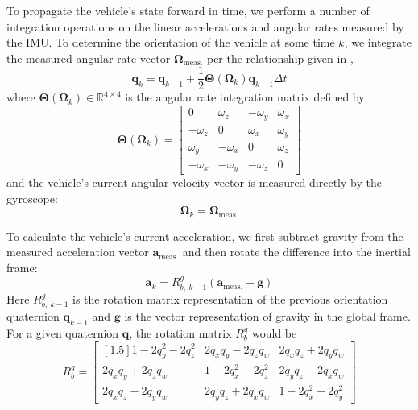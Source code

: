To propagate the vehicle's state forward in time, we perform a number of integration operations on the linear accelerations and angular rates measured by the IMU. To determine the orientation of the vehicle at some time $k$, we integrate the measured angular rate vector $\bm{\Omega}_{\text{meas.}}$ per the relationship given in \cite{Stevens2015},
%
\begin{equation} \label{eq:proc_quat}
\mathbf{q}_{k} = \mathbf{q}_{k-1} + \frac{1}{2} \mathbf{\Theta} \left( \bm{\Omega}_{k} \right) \mathbf{q}_{k-1} \Delta t
\end{equation}
%
where $\mathbf{\Theta} \left( \bm{\Omega}_{k} \right) \in \mathbb{R}^{4 \times 4}$ is the angular rate integration matrix defined by
%
\begin{equation}
\mathbf{\Theta} \left( \bm{\Omega}_{k} \right) =
\begin{bmatrix}
0 & \omega_{z} & -\omega_{y} & \omega_{x} \\
-\omega_{z} & 0 & \omega_{x} & \omega_{y} \\
\omega_{y} & -\omega_{x} & 0 & \omega_{z} \\
-\omega_{x} & -\omega_{y} & -\omega_{z} & 0
\end{bmatrix}
\end{equation}
%
and the vehicle's current angular velocity vector is measured directly by the gyroscope:
%
\begin{equation} \label{eq:proc_ang_vel}
\bm{\Omega}_{k} = \bm{\Omega}_{\text{meas.}}
\end{equation}

To calculate the vehicle's current acceleration, we first subtract gravity from the measured acceleration vector $\mathbf{a}_{\text{meas.}}$ and then rotate the difference into the inertial frame:
%
\begin{equation} \label{eq:proc_acc}
\mathbf{a}_{k} = R^{g}_{b,\ k-1} \left( \mathbf{a}_{\text{meas.}} - \mathbf{g} \right)
\end{equation}
%
Here $R^{g}_{b,\ k-1}$ is the rotation matrix representation of the previous orientation quaternion $\mathbf{q}_{k-1}$ and $\mathbf{g}$ is the vector representation of gravity in the global frame. For a given quaternion $\mathbf{q}$, the rotation matrix $R^{g}_{b}$ would be
%
\begin{equation}
R^{g}_{b} =
\begin{bmatrix}[1.5]
    1 - 2 q_{y}^2 - 2 q_{z}^2 & 2 q_{x} q_{y} - 2 q_{z} q_{w} & 2 q_{x} q_{z} + 2 q_{y} q_{w} \\
    2 q_{x} q_{y} + 2 q_{z} q_{w} & 1 - 2 q_{x}^2 - 2 q_{z}^2 & 2 q_{y} q_{z} - 2 q_{x} q_{w} \\
    2 q_{x} q_{z} - 2 q_{y} q_{w} & 2 q_{y} q_{z} + 2 q_{x} q_{w} & 1 - 2 q_{x}^2 - 2 q_{y}^2
\end{bmatrix}
\end{equation}

